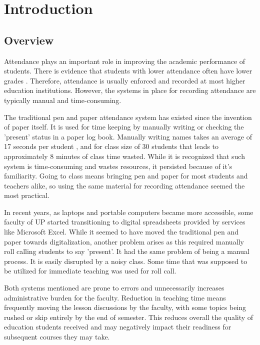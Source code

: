 \chapter{Introduction}
\label{sec:researchdesc}    %

\section{Overview}
\label{sec:overview}

Attendance plays an important role in improving the academic performance of students. There is evidence that students with lower attendance often have lower grades \cite{EJES3887}. Therefore, attendance is usually enforced and recorded at most higher education institutions. However, the systems in place for recording attendance are typically manual and time-consuming.

The traditional pen and paper attendance system has existed since the invention of paper itself. It is used for time keeping by manually writing or checking the 'present' status in a paper log book. Manually writing names takes an average of 17 seconds per student \cite{shoewu:2014}, and for class size of 30 students that leads to approximately 8 minutes of class time wasted. While it is recognized that such system is time-consuming and wastes resources, it persisted because of it's familiarity. Going to class means bringing pen and paper for most students and teachers alike, so using the same material for recording attendance seemed the most practical.

In recent years, as laptops and portable computers became more accessible, some faculty of UP started transitioning to digital spreadsheets provided by services like Microsoft Excel. While it seemed to have moved the traditional pen and paper towards digitalization, another problem arises as this required manually roll calling students to say 'present'. It had the same problem of being a manual process. It is easily disrupted by a noisy class. Some time that was supposed to be utilized for immediate teaching was used for roll call.

Both systems mentioned are prone to errors and unnecessarily increases administrative burden for the faculty. Reduction in teaching time means frequently moving the lesson discussions by the faculty, with some topics being rushed or skip entirely by the end of semester. This reduces overall the quality of education students received and may negatively impact their readiness for subsequent courses they may take. 

